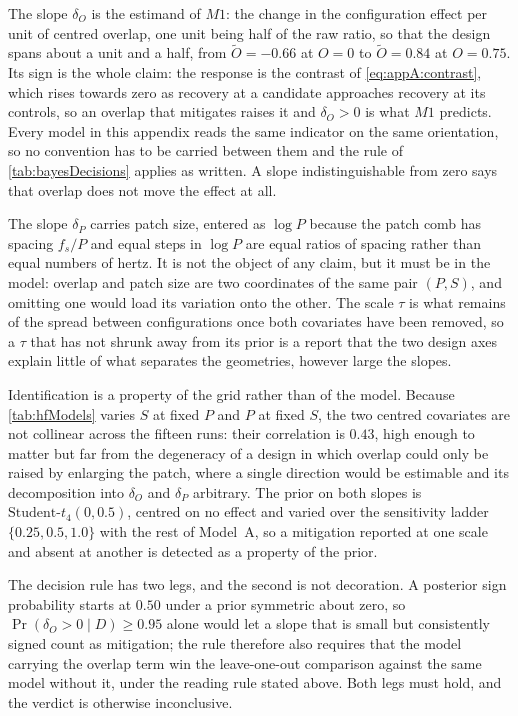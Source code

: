 The slope $\delta_O$ is the estimand of $M1$: the change in the configuration effect per unit of centred overlap, one unit being half of the raw ratio, so that the design spans about a unit and a half, from $\widetilde O=-0.66$ at $O=0$ to $\widetilde O=0.84$ at $O=0.75$. Its sign is the whole claim: the response is the contrast of \autoref{eq:appA:contrast}, which rises towards zero as recovery at a candidate approaches recovery at its controls, so an overlap that mitigates raises it and $\delta_O>0$ is what $M1$ predicts. Every model in this appendix reads the same indicator on the same orientation, so no convention has to be carried between them and the rule of \autoref{tab:bayesDecisions} applies as written. A slope indistinguishable from zero says that overlap does not move the effect at all.

The slope $\delta_P$ carries patch size, entered as $\log P$ because the patch comb has spacing $f_s/P$ and equal steps in $\log P$ are equal ratios of spacing rather than equal numbers of hertz. It is not the object of any claim, but it must be in the model: overlap and patch size are two coordinates of the same pair $(P,S)$, and omitting one would load its variation onto the other. The scale $\tau$ is what remains of the spread between configurations once both covariates have been removed, so a $\tau$ that has not shrunk away from its prior is a report that the two design axes explain little of what separates the geometries, however large the slopes.

Identification is a property of the grid rather than of the model. Because \autoref{tab:hfModels} varies $S$ at fixed $P$ and $P$ at fixed $S$, the two centred covariates are not collinear across the fifteen runs: their correlation is $0.43$, high enough to matter but far from the degeneracy of a design in which overlap could only be raised by enlarging the patch, where a single direction would be estimable and its decomposition into $\delta_O$ and $\delta_P$ arbitrary. The prior on both slopes is $\text{Student-}t_4(0,0.5)$, centred on no effect and varied over the sensitivity ladder $\{0.25,0.5,1.0\}$ with the rest of Model~A, so a mitigation reported at one scale and absent at another is detected as a property of the prior.



The decision rule has two legs, and the second is not decoration. A posterior sign probability starts at $0.50$ under a prior symmetric about zero, so $\Pr(\delta_O>0\mid D)\ge 0.95$ alone would let a slope that is small but consistently signed count as mitigation; the rule therefore also requires that the model carrying the overlap term win the leave-one-out comparison against the same model without it, under the reading rule stated above. Both legs must hold, and the verdict is otherwise inconclusive.

